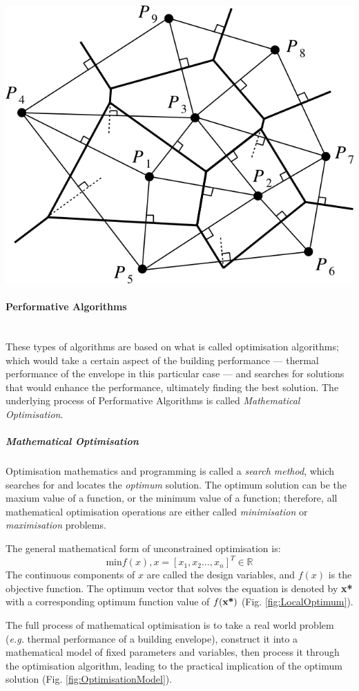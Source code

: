 \documentclass[11pt,a4paper,oneside]{article}
\newenvironment{Figure}		%
	{\par\medskip\noindent\minipage{\linewidth}}
	{\endminipage\par\medskip}
\begin{document}
\begin{multicols}{2}
\begin{Figure}
	\centering
	\includegraphics[width=0.8\linewidth]{./Images/3-VoronoiDiagram}
	\label{fig:Voronoi}
\end{Figure}

	\paragraph{Performative Algorithms}\mbox{}\\

	These types of algorithms are based on what is called optimisation algorithms; which would take a certain aspect of the building performance --- thermal performance of the envelope in this particular case --- and searches for solutions that would enhance the performance, ultimately finding the best solution. The underlying process of Performative Algorithms is called \emph{Mathematical Optimisation}.

		\subparagraph{Mathematical Optimisation}

		Optimisation mathematics and programming is called a \emph{search method}, which searches for and locates the \emph{optimum} solution. The optimum solution can be the maxium value of a function, or the minimum value of a function; therefore, all mathematical optimisation operations are either called \emph{minimisation} or \emph{maximisation} problems.

		The general mathematical form of unconstrained optimisation is:\\
\begin{equation}
\text{min} f(x), x=[x_1,x_2\dots,x_n]^T \in \mathbb{R}
\end{equation}
The continuous components of $x$ are called the design variables, and $f(x)$ is the objective function. The optimum vector that solves the equation is denoted by \textbf{x*} with a corresponding optimum function value of $f(\text{\textbf{x*}})$ (Fig. \ref{fig:LocalOptimum}).

		The full process of mathematical optimisation is to take a real world problem (\emph{e.g.} thermal performance of a building envelope), construct it into a mathematical model of fixed parameters and variables, then process it through the optimisation algorithm, leading to the practical implication of the optimum solution (Fig. \ref{fig:OptimisationModel}).

\end{multicols}
\end{document}
